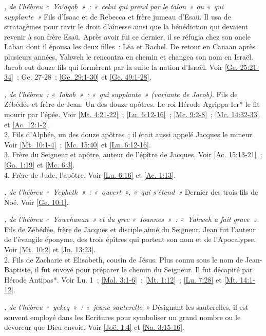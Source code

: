 \begin{multicols}{2}
\textit{, de l'hébreu «~Ya`aqob~»~: «~celui qui prend par le talon~» ou «~qui supplante~»}\newline
Fils d'Isaac et de Rebecca et frère jumeau d'Esaü. Il usa de stratagèmes pour ravir le droit d'aînesse ainsi que la bénédiction qui devaient revenir à son frère Esaü. Après avoir fui ce dernier, il se réfugia chez son oncle Laban dont il épousa les deux filles~: Léa et Rachel. De retour en Canaan après plusieurs années, Yahweh le rencontra en chemin et changea son nom en Israël. Jacob eut douze fils qui formèrent par la suite la nation d'Israël. Voir \vref{Ge. 25:21-34}~; Ge. 27-28~; \vref{Ge. 29:1-30} et \vref{Ge. 49:1-28}.

\textit{, de l'hébreu~: «~Iakob~»~: «~qui supplante~» (variante de Jacob)}. Fils de Zébédée et frère de Jean. Un des douze apôtres. Le roi Hérode Agrippa Ier* le fit mourir par l'épée. Voir \vref{Mt. 4:21-22}~; \vref{Lu. 6:12-16}~; \vref{Mc. 9:2-8}~; \vref{Mc. 14:32-33} et \vref{Ac. 12:1-2}.
\\2. Fils d'Alphée, un des douze apôtres~; il était aussi appelé Jacques le mineur. Voir \vref{Mt. 10:1-4}~; \vref{Mc. 15:40} et \vref{Lu. 6:12-16}.
\\3. Frère du Seigneur et apôtre, auteur de l'épître de Jacques. Voir \vref{Ac. 15:13-21}~; \vref{Ga. 1:19} et \vref{Mc. 6:3}.
\\4. Frère de Jude, l'apôtre. Voir \vref{Lu. 6:16} et \vref{Ac. 1:13}.

\textit{, de l'hébreu «~Yepheth~»~: «~ouvert~», «~qui s'étend~»}\newline
Dernier des trois fils de Noé. Voir \vref{Ge. 10:1}.

\textit{, de l'hébreu «~Yowchanan~» et du grec «~Ioannes~»~: «~Yahweh a fait grace~»}. Fils de Zébédée, frère de Jacques et disciple aimé du Seigneur. Jean fut l'auteur de l'évangile éponyme, des trois épîtres qui portent son nom et de l'Apocalypse. Voir \vref{Mt. 10:2} et \vref{Jn. 13:23}.
\\2. Fils de Zacharie et Elisabeth, cousin de Jésus. Plus connu sous le nom de Jean-Baptiste, il fut envoyé pour préparer le chemin du Seigneur. Il fut décapité par Hérode Antipas*. Voir Lu. 1~; \vref{Mal. 3:1-6}~; \vref{Mt. 1:12}~; \vref{Lu. 7:28} et \vref{Mt. 14:1-12}.

\textit{, de l'hébreu «~yekeq~»~: «~jeune sauterelle~»}\newline
Désignant les sauterelles, il est souvent employé dans les Ecritures pour symboliser un grand nombre ou le dévoreur que Dieu envoie. Voir \vref{Joë. 1:4} et \vref{Na. 3:15-16}.


\end{multicols}
